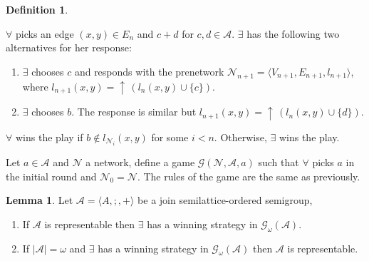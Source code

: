 \documentclass[a4paper]{article}
\theoremstyle{definition}
\newtheorem{definition}{Definition}
\theoremstyle{theorem}
\theoremstyle{proposition}
\theoremstyle{lemma}
\newtheorem{lemma}{Lemma}
\theoremstyle{ex}
\theoremstyle{corollary}
\theoremstyle{claim}
\newcommand{\up}[1]{\ensuremath{{\uparrow}\,#1}}
\begin{document}
\begin{definition}
\begin{enumerate}
\begin{enumerate}
      $\forall$ picks an edge $(x, y) \in E_n$ and $c + d$ for $c, d \in \mathcal{A}$. $\exists$ has the following two alternatives for her response:
      \begin{enumerate}
        \item $\exists$ chooses $c$ and responds with the prenetwork $\mathcal{N}_{n + 1} = \langle V_{n + 1}, E_{n + 1}, l_{n + 1} \rangle$, where $l_{n+1}(x, y) = \up{(l_n(x,y) \cup \{ c \})}$.
        \item $\exists$ chooses $b$. The response is similar but $l_{n + 1}(x, y) = \up{(l_n(x,y) \cup \{ d \})}$.
      \end{enumerate}
    \end{enumerate}
  \end{enumerate}

  $\forall$ wins the play if $b \notin l_{\mathcal{N}_i}(x,y)$ for some $i < n$. Otherwise, $\exists$ wins the play.

  Let $a \in \mathcal{A}$ and $\mathcal{N}$ a network, define a game $\mathcal{G}(\mathcal{N}, \mathcal{A}, a)$ such that $\forall$ picks $a$ in the initial round and $\mathcal{N}_0 = \mathcal{N}$. The rules of the game are the same as previously.
\end{definition}

\begin{lemma} \label{rep} Let $\mathcal{A} = \langle A, ;, + \rangle$ be a join semilattice-ordered semigroup,

  \begin{enumerate}
    \item If $\mathcal{A}$ is representable then $\exists$ has a winning strategy in $\mathcal{G}_{\omega}(\mathcal{A})$.
    \item If $|\mathcal{A}| = \omega$ and $\exists$ has a winning strategy in $\mathcal{G}_{\omega}(\mathcal{A})$ then $\mathcal{A}$ is representable.
  \end{enumerate}
\end{lemma}
\end{document}
